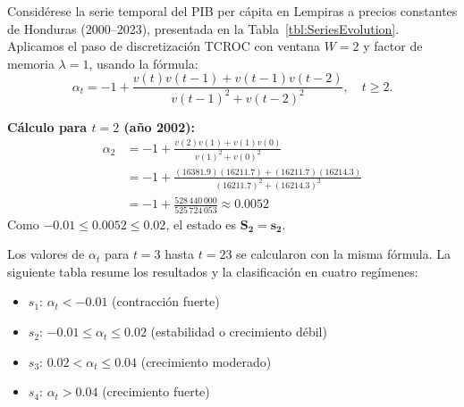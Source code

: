 \begin{examplex}
\label{ex:discretizacion_tcroc}
Considérese la serie temporal del PIB per cápita en Lempiras a precios constantes de Honduras (2000--2023), presentada en la Tabla~\ref{tbl:SeriesEvolution}. Aplicamos el paso de discretización TCROC con ventana \(W = 2\) y factor de memoria \(\lambda = 1\), usando la fórmula:
\[
\alpha_t = -1 + \frac{v(t)v(t-1) + v(t-1)v(t-2)}{v(t-1)^2 + v(t-2)^2}, \quad t \geq 2.
\]

\textbf{Cálculo para \(t=2\) (año 2002):}
\begin{align*}
    \alpha_{2} &= -1 + \frac{v(2)v(1) + v(1)v(0)}{v(1)^2 + v(0)^2} \\
    &= -1 + \frac{(16381.9)(16211.7) + (16211.7)(16214.3)}{(16211.7)^2 + (16214.3)^2} \\
    &= -1 + \frac{528\,440\,000}{525\,724\,053} \approx 0.0052
\end{align*}
Como \(-0.01 \leq 0.0052 \leq 0.02\), el estado es \(\mathbf{S_2 = s_2}\).

Los valores de \(\alpha_t\) para \(t = 3\) hasta \(t = 23\) se calcularon con la misma fórmula. La siguiente tabla resume los resultados y la clasificación en cuatro regímenes:

\begin{itemize}
    \item  \(s_1\): \(\alpha_t < -0.01\) (contracción fuerte)
    \item  \(s_2\): \(-0.01 \leq \alpha_t \leq 0.02\) (estabilidad o crecimiento débil)
    \item  \(s_3\): \(0.02 < \alpha_t \leq 0.04\) (crecimiento moderado)
    \item  \(s_4\): \(\alpha_t > 0.04\) (crecimiento fuerte)
\end{itemize}


\end{examplex}
